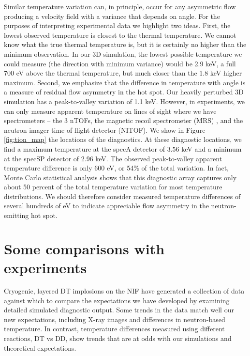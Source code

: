 \documentclass[aip,pop,numerical,reprint,floatfix]{revtex4-1}
\begin{document}
Similar temperature variation can, in principle, occur for any asymmetric
flow producing a velocity field with a variance that depends on angle.
For the purposes of interpreting experimental data we highlight two
ideas. First, the lowest observed temperature is closest to the thermal
temperature. We cannot know what the true thermal temperature is,
but it is certainly no higher than the minimum observation. In our
3D simulation, the lowest possible temperature we could measure (the
direction with minimum variance) would be 2.9 keV, a full 700 eV above
the thermal temperature, but much closer than the 1.8 keV higher maximum.
Second, we emphasize that the difference in temperature with angle
is a measure of residual flow asymmetry in the hot spot. Our heavily
perturbed 3D simulation has a peak-to-valley variation of 1.1 keV.
However, in experiments, we can only measure apparent temperature
on lines of sight where we have spectrometers -- the 3 nTOFs, the
magnetic recoil spectrometer (MRS) \cite{frenje_mrs_dsr,gatujohnson_mrs_velocity_2013},
and the neutron imager time-of-flight detector (NITOF). We show in
Figure \ref{fig:tion_map} the locations of the diagnostics. At these
diagnostic locations, we find a maximum temperature at the specA detector
of 3.56 keV and a minimum at the specSP detector of 2.96 keV. The
observed peak-to-valley apparent temperature difference is only 600
eV, or 54\% of the total variation. In fact, Monte Carlo statistical
analysis shows that this diagnostic array captures only about 50 percent
of the total temperature variation for most temperature distributions.
We should therefore consider measured temperature differences of several
hundreds of eV to indicate appreciable flow asymmetry in the neutron-emitting
hot spot.

\section{\label{sec:experiment}Some comparisons with experiments}

Cryogenic, layered DT implosions on the NIF have generated a collection
of data against which to compare the expectations we have developed
by examining detailed simulated diagnostic output. Some trends in
the data match well our new expectations, including X-ray images and
differences in neutron-based temperature. In contrast, temperature
differences measured using different reactions, DT vs DD, show trends
that are at odds with our simulations and theoretical expectations.
\end{document}

